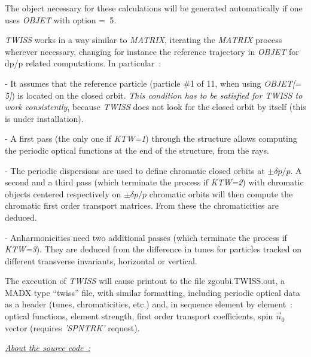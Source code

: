 {\medskip 

\noindent  The object necessary for these calculations 
  will be generated automatically if one uses \textsl{OBJET}  with
option \mbox{\KOBJ= 5}.   

 \medskip 

\noindent \textsl{TWISS} works in a way similar to \textsl{MATRIX}, iterating the \textsl{MATRIX} process wherever necessary, 
changing for instance the reference trajectory in \textsl{OBJET} for dp/p related computations. 
\noindent In particular~: 

\medskip

- It assumes that the reference particle (particle \#1 of 11, when using \textsl{OBJET[\KOBJ= 5]}) is located on 
the closed orbit. \textsl{This condition has to be satisfied for TWISS to work consistently}, 
because  \textsl{TWISS} does not look for the closed orbit by itself (this is under installation).  

- A first pass (the only one if \textsl{KTW=1}) through the structure allows computing the periodic 
optical functions at the end of the structure,  from the  rays.

- The periodic dispersions  are used to define chromatic closed orbits at $\pm \delta p / p$. A second and a third pass 
(which terminate the process if \textsl{KTW=2}) with 
chromatic objects centered respectively  on $\pm \delta p / p$ chromatic orbits will then compute the chromatic 
first order transport matrices. From these the chromaticities are deduced. 

- Anharmonicities need two additional passes (which terminate the process if \textsl{KTW=3}). 
They are deduced from the difference in tunes for particles 
tracked on different transverse invariants, horizontal or vertical. 

\bigskip

\noindent The execution of  \textsl{TWISS} will cause printout to the file zgoubi.TWISS.out, a MADX type ``twiss'' file, 
with similar formatting, including   periodic optical data as a header (tunes, chromaticities, etc.) and, 
in sequence element by element~: optical functions, element strength, first order transport coefficients, spin $\vec n_0$ vector 
(requires \textsl{'SPNTRK'} request). 





\bigskip


\noindent \underline{\textsl{About the source code~: }}

}

